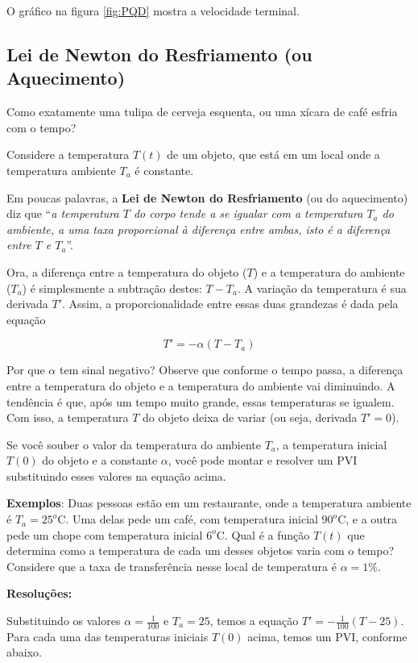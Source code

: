 \documentclass[a4paper]{article}
\begin{document}
O gráfico na figura \ref{fig:PQD} mostra a velocidade terminal.


\subsection{Lei de Newton do Resfriamento (ou Aquecimento)}

Como exatamente uma tulipa de cerveja esquenta, ou uma xícara de café
esfria com o tempo?

Considere a temperatura $T(t)$ de um objeto, que está em um local onde
a temperatura ambiente $T_a$ é constante.

Em poucas palavras, a {\bf Lei de Newton do Resfriamento} (ou do
aquecimento) diz que ``{\em a temperatura $T$ do corpo tende a se
  igualar com a temperatura $T_a$ do ambiente, a uma taxa proporcional
  à diferença entre ambas, isto é a diferença entre $T$ e $T_a$}''.

Ora, a diferença entre a temperatura do objeto ($T$) e a temperatura
do ambiente ($T_a$) é simplesmente a subtração destes: $T - T_a$. A
variação da temperatura é sua derivada $T'$. Assim, a
proporcionalidade entre essas duas grandezas é dada pela equação

\begin{displaymath}
  T' = -\alpha(T-T_a)
\end{displaymath}

Por que $\alpha$ tem sinal negativo? Observe que conforme o tempo passa, a
diferença entre a temperatura do objeto e a temperatura do ambiente
vai diminuindo. A tendência é que, após um tempo muito grande, essas
temperaturas se igualem. Com isso, a temperatura $T$ do objeto deixa
de variar (ou seja, derivada $T'=0$).

Se você souber o valor da temperatura do ambiente $T_a$, a temperatura
inicial $T(0)$ do objeto e a constante $\alpha$, você pode montar e
resolver um PVI substituindo esses valores na equação acima.

{\bf Exemplos}: Duas pessoas estão em um restaurante, onde a
temperatura ambiente é $T_a=25^o$C. Uma delas pede um café, com
temperatura inicial $90^o$C, e a outra pede um chope com temperatura
inicial $6^o$C. Qual é a função $T(t)$ que determina como a
temperatura de cada um desses objetos varia com o tempo? Considere que
a taxa de transferência nesse local de temperatura é $\alpha=1\%$.

{\bf Resoluções:}

Substituindo os valores $\alpha=\frac{1}{100}$ e $T_a=25$, temos a
equação $T'=-\frac{1}{100}(T-25)$. Para cada uma das temperaturas
iniciais $T(0)$ acima, temos um PVI, conforme abaixo.
\end{document}
